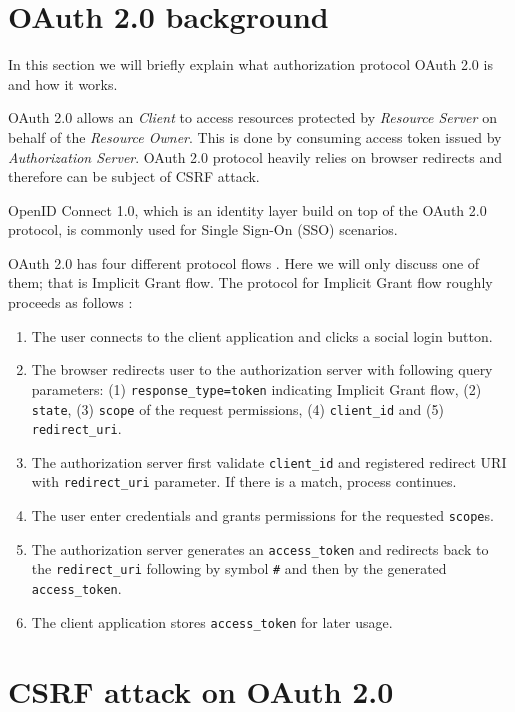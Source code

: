 \documentclass[journal,a4paper,twoside]{template/IEEEtran}
\begin{document}
\section{OAuth 2.0 background}
\label{sec_oauth2background}
In this section we will briefly explain what authorization protocol OAuth 2.0 is and how it works.

OAuth 2.0 \cite{Hardt2018Nov} allows an \textit{Client} to access resources protected by \textit{Resource Server} on behalf of the \textit{Resource Owner}. This is done by consuming access token issued by \textit{Authorization Server}. OAuth 2.0 protocol heavily relies on browser redirects and therefore can be subject of CSRF attack.

OpenID Connect 1.0, which is an identity layer build on top of the OAuth 2.0 protocol, is commonly used for Single Sign-On (SSO) scenarios.

OAuth 2.0 has four different protocol flows \cite{Hardt2018Nov}. Here we will only discuss one of them; that is Implicit Grant flow. The protocol for Implicit Grant flow roughly proceeds as follows \cite{li2018mitigating}:
\begin{enumerate}
    \item The user connects to the client application and clicks a social login button.
    \item The browser redirects user to the authorization server with following query parameters: (1) \texttt{response\_type=token} indicating Implicit Grant flow, (2) \texttt{state}, (3) \texttt{scope} of the request permissions, (4) \texttt{client\_id} and (5) \texttt{redirect\_uri}.
    \item The authorization server first validate \texttt{client\_id} and registered redirect URI with \texttt{redirect\_uri} parameter. If there is a match, process continues.
    \item The user enter credentials and grants permissions for the requested \texttt{scope}s.
    \item The authorization server generates an \texttt{access\_token} and redirects back to the \texttt{redirect\_uri} following by symbol \texttt{\#} and then by the generated \texttt{access\_token}.
    \item The client application stores \texttt{access\_token} for later usage.
\end{enumerate}

\section{CSRF attack on OAuth 2.0}
\label{sec_csrfattackonoauth2}
\end{document}
